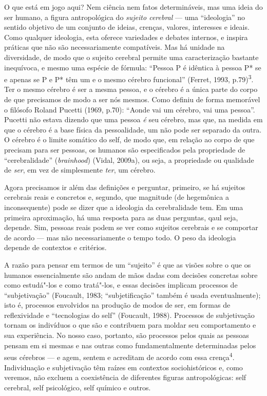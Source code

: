 O que está em jogo aqui? Nem ciência nem fatos determináveis, mas uma
ideia do ser humano, a figura antropológica do \emph{sujeito cerebral}
--- uma ``ideologia'' no sentido objetivo de um conjunto de ideias,
crenças, valores, interesses e ideais. Como qualquer ideologia, esta
oferece variedades e debates internos, e inspira práticas que não são
necessariamente compatíveis. Mas há unidade na diversidade, de modo que
o sujeito cerebral permite uma caracterização bastante inequívoca, e
mesmo uma espécie de fórmula: ``Pessoa P é idêntica à pessoa P* se e
apenas se P e P* têm um e o mesmo cérebro funcional'' (Ferret, 1993,
p.79)\textsuperscript{3}. Ter o mesmo cérebro é ser a mesma pessoa, e o
cérebro é a única parte do corpo de que precisamos de modo a ser nós
mesmos. Como definiu de forma memorável o filósofo Roland Pucetti (1969,
p.70): ``Aonde vai um cérebro, vai uma pessoa''. Pucetti não estava
dizendo que uma pessoa \emph{é} seu cérebro, mas que, na medida em que o
cérebro é a base física da pessoalidade, um não pode ser separado da
outra. O cérebro é o limite somático do self, de modo que, em relação ao
corpo de que precisam para ser pessoas, os humanos são especificados
pela propriedade de ``cerebralidade'' (\emph{brainhood}) (Vidal, 2009a),
ou seja, a propriedade ou qualidade de \emph{ser}, em vez de
simplesmente \emph{ter}, um cérebro.

Agora precisamos ir além das definições e perguntar, primeiro, se há
sujeitos cerebrais reais e concretos e, segundo, que magnitude (de
hegemônica a inconsequente) pode se dizer que a ideologia da
cerebralidade tem. Em uma primeira aproximação, há uma resposta para as
duas perguntas, qaul seja, depende. Sim, pessoas reais podem se ver como
sujeitos cerebrais e se comportar de acordo --- mas não necessariamente
o tempo todo. O peso da ideologia depende de contextos e critérios.

A razão para pensar em termos de um ``sujeito'' é que as visões sobre o
que os humanos essencialmente são andam de mãos dadas com decisões
concretas sobre como estudá"-los e como tratá"-los, e essas decisões
implicam processos de ``subjetivação'' (Foucault, 1983;
``subjetificação'' também é usada eventualmente); isto é, processos
envolvidos na produção de modos de ser, em formas de reflexividade e
``tecnologias do self'' (Foucault, 1988). Processos de subjetivação
tornam os indivíduos o que são e contribuem para moldar seu
comportamento e sua experiência. No nosso caso, portanto, são processos
pelos quais as pessoas pensam em si mesmas e nas outras como
fundamentalmente determinadas pelos seus cérebros --- e agem, sentem e
acreditam de acordo com essa crença\textsuperscript{4}. Individuação e
subjetivação têm raízes em contextos sociohistóricos e, como veremos,
não excluem a coexistência de diferentes figuras antropológicas: self
cerebral, self psicológico, self químico e outros.


